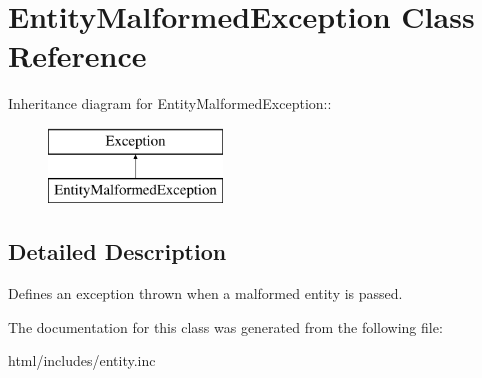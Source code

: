 \hypertarget{classEntityMalformedException}{
\section{EntityMalformedException Class Reference}
\label{classEntityMalformedException}
}
Inheritance diagram for EntityMalformedException::\begin{figure}[H]
\begin{center}
\leavevmode
\includegraphics[height=2cm]{classEntityMalformedException}
\end{center}
\end{figure}


\subsection{Detailed Description}
Defines an exception thrown when a malformed entity is passed. 

The documentation for this class was generated from the following file:\begin{DoxyCompactItemize}
\item 
html/includes/entity.inc\end{DoxyCompactItemize}
